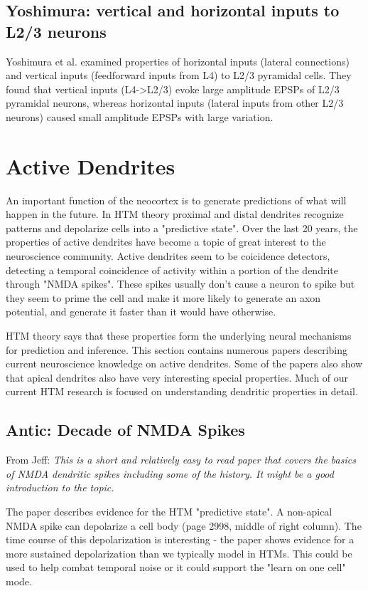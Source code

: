 \documentclass{article} %
\begin{document}
\subsection{Yoshimura: vertical and horizontal inputs to L2/3 neurons}

Yoshimura et al. \cite{Yoshimura2000} examined properties of horizontal inputs 
(lateral connections) and vertical inputs (feedforward inputs from L4) to L2/3 
pyramidal cells. They found that vertical inputs (L4->L2/3) evoke large amplitude 
EPSPs of L2/3 pyramidal neurons, whereas horizontal inputs 
(lateral inputs from other L2/3 neurons) caused small amplitude EPSPs with 
large variation.

\section{Active Dendrites}

An important function of the neocortex is to generate predictions of what will
happen in the future. In HTM theory proximal and distal dendrites recognize
patterns and depolarize cells into a "predictive state". Over the last 20 years,
the properties of active dendrites have become a topic of great  interest to the
neuroscience community. Active dendrites seem to be coicidence detectors,
detecting a temporal coincidence of activity within a portion of the dendrite
through "NMDA spikes". These spikes usually don't cause a neuron to spike but
they  seem to prime the cell and make it more likely to generate an axon
potential, and generate it faster than it would have otherwise.

HTM theory says that these properties form the underlying neural mechanisms for
prediction and inference. This section contains numerous papers describing
current neuroscience knowledge on active dendrites.  Some of the papers also
show that apical dendrites also have very interesting special properties.  Much
of our current HTM research is focused on understanding dendritic properties in
detail.

\subsection{Antic: Decade of NMDA Spikes}
From Jeff: \emph{This is a short and relatively easy to read paper that covers
 the basics of NMDA dendritic spikes including some of the history.  It might be a
good introduction to the topic.}

The paper \cite{Antic2010} describes evidence for the HTM "predictive state". A
non-apical NMDA spike can depolarize a cell body (page 2998, middle of right
column). The time course of this depolarization is interesting - the paper shows
evidence for a more sustained depolarization than we typically model in HTMs.
This could be used to help combat temporal noise or it could support the "learn
on one cell" mode.
\end{document}
